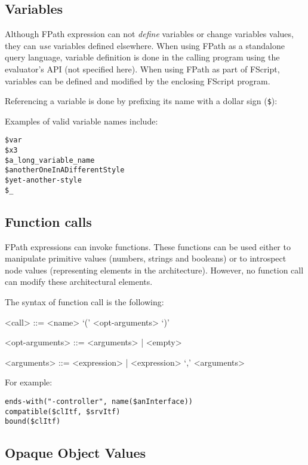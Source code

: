 \documentclass[a4paper,12pt]{report}
\begin{document}
\subsection{Variables}
\label{sec:variables}

Although FPath expression can not \emph{define} variables or change variables values, they
can \emph{use} variables defined elsewhere. When using FPath as a standalone query
language, variable definition is done in the calling program using the evaluator's API
(not specified here). When using FPath as part of FScript, variables can be defined and
modified by the enclosing FScript program.

Referencing a variable is done by prefixing its name with a dollar sign (\verb+$+):

Examples of valid variable names include:
\begin{verbatim}
$var
$x3
$a_long_variable_name
$anotherOneInADifferentStyle
$yet-another-style
$_
\end{verbatim}

\subsection{Function calls}
\label{sec:function-calls}

FPath expressions can invoke functions. These functions can be used either to manipulate
primitive values (numbers, strings and booleans) or to introspect node values
(representing elements in the architecture). However, no function call can modify these
architectural elements.

The syntax of function call is the following:
\begin{grammar}
<call> ::= <name> `(' <opt-arguments> `)'

<opt-arguments> ::= <arguments> | <empty>

<arguments> ::= <expression> | <expression> `,' <arguments>
\end{grammar}

For example:
\begin{verbatim}
ends-with("-controller", name($anInterface))
compatible($clItf, $srvItf)
bound($clItf)
\end{verbatim}

\subsection{Opaque Object Values}
\label{sec:opaque-object-values}
\end{document}
